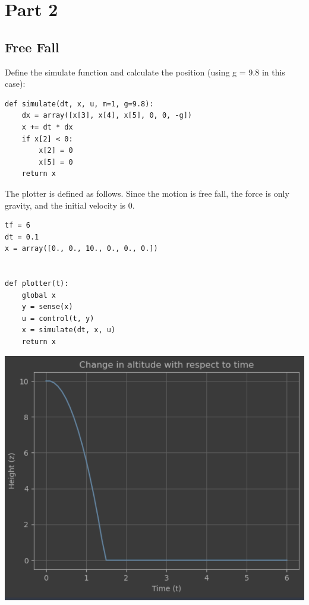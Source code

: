 \documentclass[letterpaper, 10 pt, conference]{ieeeconf}  %
\begin{document}
    \section{Part 2}

    \subsection{Free Fall}

    Define the simulate function and calculate the position (using g = 9.8 in this case):

    \begin{lstlisting}[label={lst:lstlisting3}]
def simulate(dt, x, u, m=1, g=9.8):
    dx = array([x[3], x[4], x[5], 0, 0, -g])
    x += dt * dx
    if x[2] < 0:
        x[2] = 0
        x[5] = 0
    return x
    \end{lstlisting}

    The plotter is defined as follows.
    Since the motion is free fall, the force is only gravity, and the initial velocity is 0.

    \begin{lstlisting}[label={lst:lstlisting4}]
tf = 6
dt = 0.1
x = array([0., 0., 10., 0., 0., 0.])


def plotter(t):
    global x
    y = sense(x)
    u = control(t, y)
    x = simulate(dt, x, u)
    return x
    \end{lstlisting}

    \begin{center}
        \includegraphics[scale=0.4]{2-1}
    \end{center}
\end{document}
